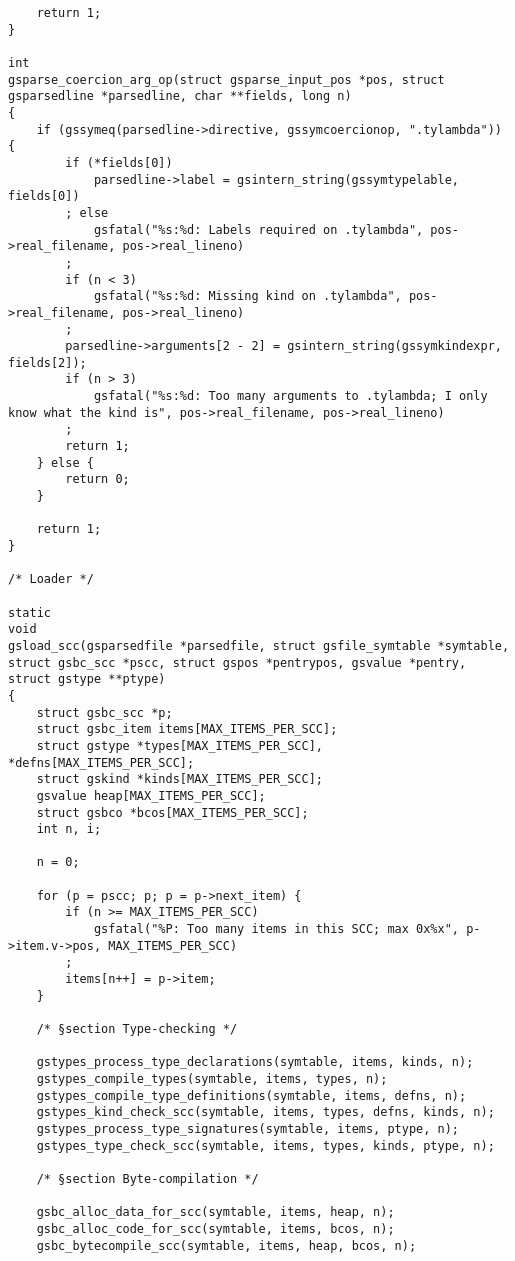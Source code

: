 \documentclass{report}
\begin{document}
\begin{verbatim}
    return 1;
}

int
gsparse_coercion_arg_op(struct gsparse_input_pos *pos, struct gsparsedline *parsedline, char **fields, long n)
{
    if (gssymeq(parsedline->directive, gssymcoercionop, ".tylambda")) {
        if (*fields[0])
            parsedline->label = gsintern_string(gssymtypelable, fields[0])
        ; else
            gsfatal("%s:%d: Labels required on .tylambda", pos->real_filename, pos->real_lineno)
        ;
        if (n < 3)
            gsfatal("%s:%d: Missing kind on .tylambda", pos->real_filename, pos->real_lineno)
        ;
        parsedline->arguments[2 - 2] = gsintern_string(gssymkindexpr, fields[2]);
        if (n > 3)
            gsfatal("%s:%d: Too many arguments to .tylambda; I only know what the kind is", pos->real_filename, pos->real_lineno)
        ;
        return 1;
    } else {
        return 0;
    }

    return 1;
}

/* Loader */

static
void
gsload_scc(gsparsedfile *parsedfile, struct gsfile_symtable *symtable, struct gsbc_scc *pscc, struct gspos *pentrypos, gsvalue *pentry, struct gstype **ptype)
{
    struct gsbc_scc *p;
    struct gsbc_item items[MAX_ITEMS_PER_SCC];
    struct gstype *types[MAX_ITEMS_PER_SCC], *defns[MAX_ITEMS_PER_SCC];
    struct gskind *kinds[MAX_ITEMS_PER_SCC];
    gsvalue heap[MAX_ITEMS_PER_SCC];
    struct gsbco *bcos[MAX_ITEMS_PER_SCC];
    int n, i;

    n = 0;

    for (p = pscc; p; p = p->next_item) {
        if (n >= MAX_ITEMS_PER_SCC)
            gsfatal("%P: Too many items in this SCC; max 0x%x", p->item.v->pos, MAX_ITEMS_PER_SCC)
        ;
        items[n++] = p->item;
    }

    /* §section Type-checking */

    gstypes_process_type_declarations(symtable, items, kinds, n);
    gstypes_compile_types(symtable, items, types, n);
    gstypes_compile_type_definitions(symtable, items, defns, n);
    gstypes_kind_check_scc(symtable, items, types, defns, kinds, n);
    gstypes_process_type_signatures(symtable, items, ptype, n);
    gstypes_type_check_scc(symtable, items, types, kinds, ptype, n);

    /* §section Byte-compilation */

    gsbc_alloc_data_for_scc(symtable, items, heap, n);
    gsbc_alloc_code_for_scc(symtable, items, bcos, n);
    gsbc_bytecompile_scc(symtable, items, heap, bcos, n);


\end{verbatim}
\end{document}
